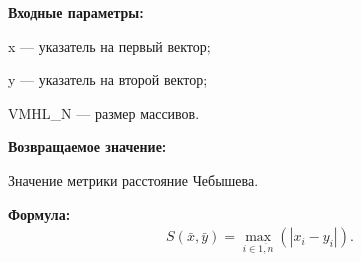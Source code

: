 \textbf{Входные параметры:}
 
x --- указатель на первый вектор;
 
y --- указатель на второй вектор;
 
VMHL\_N --- размер массивов.

\textbf{Возвращаемое значение:}
 
Значение метрики расстояние Чебышева.

\textbf{Формула:}
\begin{eqnarray*}
S\left( \bar{x}, \bar{y}\right)=\max_{i\in\overline{1,n}}\left( \left|x_i-y_i \right| \right)  .
\end{eqnarray*}